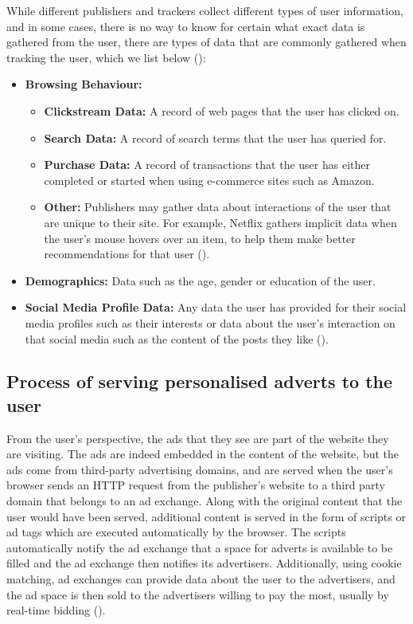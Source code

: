 \documentclass{l4proj}
\begin{document}
While different publishers and trackers collect different types of user information, and in some cases, there is no way to know for certain what exact data is gathered from the user, there are types of data that are commonly gathered when tracking the user, which we list below (\cite{addata}):
\begin{itemize}
   \item 
   \textbf{Browsing Behaviour:}
   \begin{itemize}
	\item
           \textbf{Clickstream Data:} A record of web pages that the user has clicked on.
	\item
           \textbf{Search Data:} A record of search terms that the user has queried for.
	\item
           \textbf{Purchase Data:} A record of transactions that the user has either completed or started when using e-commerce sites such as Amazon.
	\item
           \textbf{Other:} Publishers may gather data about interactions of the user that are unique to their site. For example, Netflix gathers implicit data when the user's mouse hovers over an item, to help them make better recommendations for that user (\cite{netflix}).
   \end{itemize}
   \item
   \textbf{Demographics:} Data such as the age, gender or education of the user.
   \item
   \textbf{Social Media Profile Data:} Any data the user has provided for their social media profiles such as their interests or data about the user's interaction on that social media such as the content of the posts they like (\cite{fbook}).
\end{itemize}

\subsection{Process of serving personalised adverts to the user}
From the user's perspective, the ads that they see are part of the website they are visiting. The ads are indeed embedded in the content of the website, but the ads come from third-party advertising domains, and are served when the user's browser sends an HTTP request from the publisher's website to a third party domain that belongs to an ad exchange. Along with the original content that the user would have been served, additional content is served in the form of scripts or ad tags which are executed automatically by the browser. The scripts automatically notify the ad exchange that a space for adverts is available to be filled and the ad exchange then notifies its advertisers. Additionally, using cookie matching, ad exchanges can provide data about the user to the advertisers, and the ad space is then sold to the advertisers willing to pay the most, usually by real-time bidding (\cite{Estrada-Jimenez2017}).
\end{document}
